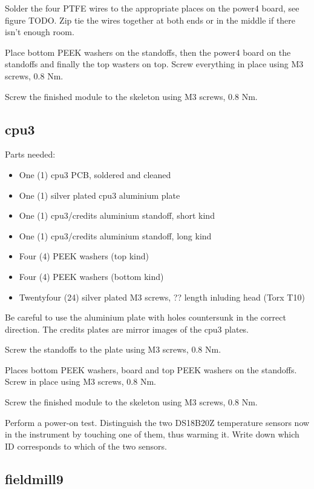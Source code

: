 \documentclass{article}
\begin{document}
Solder the four PTFE wires to the appropriate places on the power4 board, see figure TODO.
Zip tie the wires together at both ends or in the middle if there isn't enough room.

Place bottom PEEK washers on the standoffs, then the power4 board on the standoffs and finally the top wasters on top.
Screw everything in place using M3 screws, 0.8 Nm.

Screw the finished module to the skeleton using M3 screws, 0.8 Nm.

\subsection{cpu3}

Parts needed:

\begin{itemize}
\item One (1) cpu3 PCB, soldered and cleaned
\item One (1) silver plated cpu3 aluminium plate
\item One (1) cpu3/credits aluminium standoff, short kind
\item One (1) cpu3/credits aluminium standoff, long kind
\item Four (4) PEEK washers (top kind)
\item Four (4) PEEK washers (bottom kind)
\item Twentyfour (24) silver plated M3 screws, ?? length inluding head (Torx T10)
\end{itemize}

Be careful to use the aluminium plate with holes countersunk in the correct direction.
The credits plates are mirror images of the cpu3 plates.

Screw the standoffs to the plate using M3 screws, 0.8 Nm.

Places bottom PEEK washers, board and top PEEK washers on the standoffs.
Screw in place using M3 screws, 0.8 Nm.

Screw the finished module to the skeleton using M3 screws, 0.8 Nm.

Perform a power-on test.
Distinguish the two DS18B20Z temperature sensors now in the instrument by touching one of them, thus warming it.
Write down which ID corresponds to which of the two sensors.

\subsection{fieldmill9}
\end{document}
